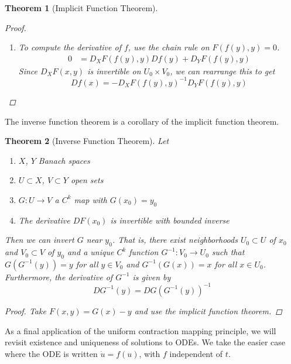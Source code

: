 \documentclass[10pt]{article}         %
\newtheorem{theorem}{Theorem}[section]
\theoremstyle{remark}
\begin{document}
\begin{theorem}[Implicit Function Theorem]
\begin{proof}
\begin{enumerate}
\item To compute the derivative of $f$, use the chain rule on $F(f(y), y) = 0$.
\begin{align*}
0 &= D_X F(f(y),y)Df(y) + D_Y F(f(y),y)
\end{align*}
Since $D_X F(x, y)$ is invertible on $U_0 \times V_0$, we can rearrange this to get
\[
Df(x) = -D_X F(f(y),y)^{-1} D_Y F(f(y),y)
\]
\end{enumerate}
\end{proof}
\end{theorem}

The inverse function theorem is a corollary of the implicit function theorem.

\begin{theorem}[Inverse Function Theorem]
Let
\begin{enumerate}
\item $X$, $Y$ Banach spaces
\item $U \subset X$, $V \subset Y$ open sets
\item $G: U \rightarrow V$ a $C^k$ map with $G(x_0) = y_0$
\item The derivative $D F(x_0)$ is invertible with bounded inverse
\end{enumerate}
Then we can invert $G$ near $y_0$. That is, there exist neighborhoods $U_0 \subset U$ of $x_0$ and $V_0 \subset V$ of $y_0$ and a unique $C^k$ function $G^{-1}: V_0 \rightarrow U_0$ such that $G(G^{-1}(y)) = y$ for all $y \in V_0$ and $G^{-1}(G(x)) = x$ for all $x \in U_0$. Furthermore, the derivative of $G^{-1}$ is given by
\[
DG^{-1}(y) = D G( G^{-1}(y) )^{-1}
\]

\begin{proof}
Take $F(x, y) = G(x) - y$ and use the implicit function theorem.
\end{proof}
\end{theorem}

As a final application of the uniform contraction mapping principle, we will revisit existence and uniqueness of solutions to ODEs. We take the easier case where the ODE is written $\dot{u} = f(u)$, with $f$ independent of $t$.
\end{document}
